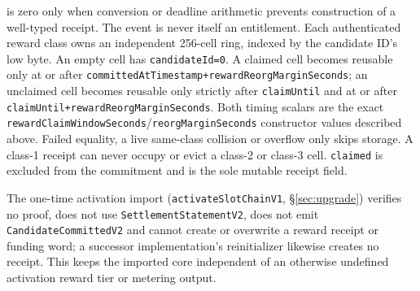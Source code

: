\documentclass[a4paper,11pt]{article}
\newcommand{\code}[1]{\nolinkurl{#1}}
\begin{document}
is zero only when conversion or deadline arithmetic prevents construction of a
well-typed receipt.  The event is never itself an entitlement.
Each authenticated reward class owns an independent 256-cell ring, indexed by
the candidate ID's low byte.  An empty cell has \code{candidateId=0}.  A claimed
cell becomes reusable only at or after
\code{committedAtTimestamp+rewardReorgMarginSeconds}; an unclaimed cell
becomes reusable only strictly after \code{claimUntil} and at or after
\code{claimUntil+rewardReorgMarginSeconds}.  Both timing scalars are the exact
\code{rewardClaimWindowSeconds}/\code{reorgMarginSeconds} constructor values
described above.  Failed equality, a live
same-class collision or overflow only skips storage.  A class-1 receipt can
never occupy or evict a class-2 or class-3 cell.  \code{claimed} is excluded
from the commitment and is the sole mutable receipt field.

The one-time activation import (\code{activateSlotChainV1},
\S\ref{sec:upgrade}) verifies no proof, does not use
\code{SettlementStatementV2}, does not emit \code{CandidateCommittedV2} and
cannot create or overwrite a reward receipt or funding word; a successor
implementation's reinitializer likewise creates no receipt.  This keeps the
imported core independent of an otherwise undefined activation reward tier or
metering output.
\end{document}
